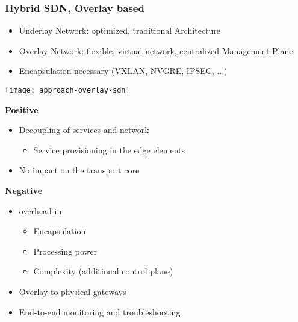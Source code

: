 \subsubsection{Hybrid SDN, Overlay based}
\begin{itemize}
	\item Underlay Network: optimized, traditional Architecture 
	\item Overlay Network: flexible, virtual network, centralized Management Plane 
	\item Encapsulation necessary (VXLAN, NVGRE, IPSEC, ...) 
\end{itemize}

\texttt{[image: approach-overlay-sdn]}

\noindent
\textbf{Positive}
\begin{itemize}
	\item Decoupling of services and network 
		\begin{itemize}\item Service provisioning in the edge elements\end{itemize}
	\item No impact on the transport core  
\end{itemize}

\noindent
\textbf{Negative}
\begin{itemize}
	\item overhead in 
	\begin{itemize} \item Encapsulation \item Processing power \item Complexity (additional control plane) \end{itemize} 
	\item Overlay-to-physical gateways
	\item End-to-end monitoring and troubleshooting  
\end{itemize}